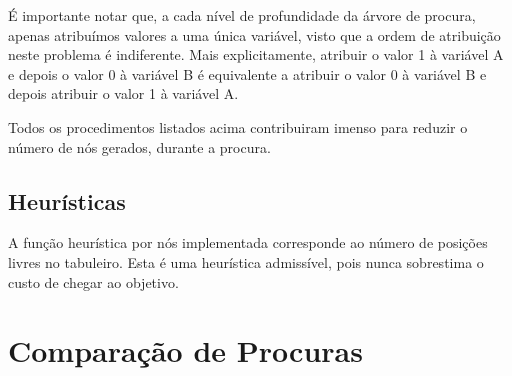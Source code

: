 \documentclass[12pt]{article}
\begin{document}
É importante notar que, a cada nível de profundidade da árvore de procura,
apenas atribuímos valores a uma única variável, visto que a ordem de atribuição
neste problema é indiferente. Mais explicitamente, atribuir o valor 1 à variável
A e depois o valor 0 à variável B é equivalente a atribuir o valor 0 à variável
B e depois atribuir o valor 1 à variável A.

Todos os procedimentos listados acima contribuiram imenso para reduzir o número
de nós gerados, durante a procura.

\subsection{Heurísticas}
A função heurística por nós implementada corresponde ao número de posições
livres no tabuleiro. Esta é uma heurística admissível, pois nunca sobrestima
o custo de chegar ao objetivo.


\section{Comparação de Procuras}
\end{document}
